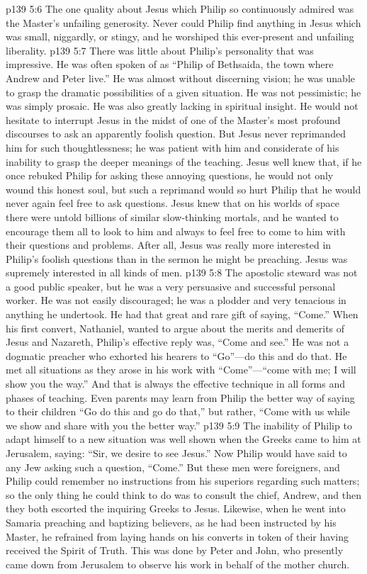 \vs p139 5:6 The one quality about Jesus which Philip so continuously admired was the Master’s unfailing generosity. Never could Philip find anything in Jesus which was small, niggardly, or stingy, and he worshiped this ever\hyp{}present and unfailing liberality.
\pc \vs p139 5:7 There was little about Philip’s personality that was impressive. He was often spoken of as “Philip of Bethsaida, the town where Andrew and Peter live.” He was almost without discerning vision; he was unable to grasp the dramatic possibilities of a given situation. He was not pessimistic; he was simply prosaic. He was also greatly lacking in spiritual insight. He would not hesitate to interrupt Jesus in the midst of one of the Master’s most profound discourses to ask an apparently foolish question. But Jesus never reprimanded him for such thoughtlessness; he was patient with him and considerate of his inability to grasp the deeper meanings of the teaching. Jesus well knew that, if he once rebuked Philip for asking these annoying questions, he would not only wound this honest soul, but such a reprimand would so hurt Philip that he would never again feel free to ask questions. Jesus knew that on his worlds of space there were untold billions of similar slow\hyp{}thinking mortals, and he wanted to encourage them all to look to him and always to feel free to come to him with their questions and problems. After all, Jesus was really more interested in Philip’s foolish questions than in the sermon he might be preaching. Jesus was supremely interested in  all kinds of men.
\vs p139 5:8 The apostolic steward was not a good public speaker, but he was a very persuasive and successful personal worker. He was not easily discouraged; he was a plodder and very tenacious in anything he undertook. He had that great and rare gift of saying, “Come.” When his first convert, Nathaniel, wanted to argue about the merits and demerits of Jesus and Nazareth, Philip’s effective reply was, “Come and see.” He was not a dogmatic preacher who exhorted his hearers to “Go”---do this and do that. He met all situations as they arose in his work with “Come”---“come with me; I will show you the way.” And that is always the effective technique in all forms and phases of teaching. Even parents may learn from Philip the better way of saying to their children  “Go do this and go do that,” but rather, “Come with us while we show and share with you the better way.”\plusone
\vs p139 5:9 The inability of Philip to adapt himself to a new situation was well shown when the Greeks came to him at Jerusalem, saying: “Sir, we desire to see Jesus.” Now Philip would have said to any Jew asking such a question, “Come.” But these men were foreigners, and Philip could remember no instructions from his superiors regarding such matters; so the only thing he could think to do was to consult the chief, Andrew, and then they both escorted the inquiring Greeks to Jesus. Likewise, when he went into Samaria preaching and baptizing believers, as he had been instructed by his Master, he refrained from laying hands on his converts in token of their having received the Spirit of Truth. This was done by Peter and John, who presently came down from Jerusalem to observe his work in behalf of the mother church.
